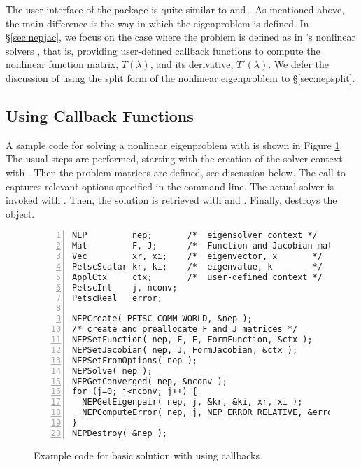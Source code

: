 The user interface of the  package is quite similar to  and . As mentioned above, the main difference is the way in which the eigenproblem is defined. In \S\ref{sec:nepjac}, we focus on the case where the problem is defined as in \petsc's nonlinear solvers , that is, providing user-defined callback functions to compute the nonlinear function matrix, $T(\lambda)$, and its derivative, $T'(\lambda)$. We defer the discussion of using the split form of the nonlinear eigenproblem to \S\ref{sec:nepsplit}.

\subsection{\label{sec:nepjac}Using Callback Functions}

A sample code for solving a nonlinear eigenproblem with  is shown in Figure \ref{fig:ex-nep}. The usual steps are performed, starting with the creation of the solver context with . Then the problem matrices are defined, see discussion below. The call to  captures relevant options specified in the command line. The actual solver is invoked with . Then, the solution is retrieved with  and . Finally,  destroys the object.

\begin{figure}
\begin{Verbatim}[fontsize=\small,numbers=left,numbersep=6pt,xleftmargin=15mm]
NEP         nep;       /*  eigensolver context */
Mat         F, J;      /*  Function and Jacobian matrices  */
Vec         xr, xi;    /*  eigenvector, x       */
PetscScalar kr, ki;    /*  eigenvalue, k        */
ApplCtx     ctx;       /*  user-defined context */
PetscInt    j, nconv;
PetscReal   error;

NEPCreate( PETSC_COMM_WORLD, &nep );
/* create and preallocate F and J matrices */
NEPSetFunction( nep, F, F, FormFunction, &ctx );
NEPSetJacobian( nep, J, FormJacobian, &ctx );
NEPSetFromOptions( nep );
NEPSolve( nep );
NEPGetConverged( nep, &nconv );
for (j=0; j<nconv; j++) {
  NEPGetEigenpair( nep, j, &kr, &ki, xr, xi );
  NEPComputeError( nep, j, NEP_ERROR_RELATIVE, &error );
}
NEPDestroy( &nep );
\end{Verbatim}
\caption{\label{fig:ex-nep}Example code for basic solution with  using callbacks.}
\end{figure}


